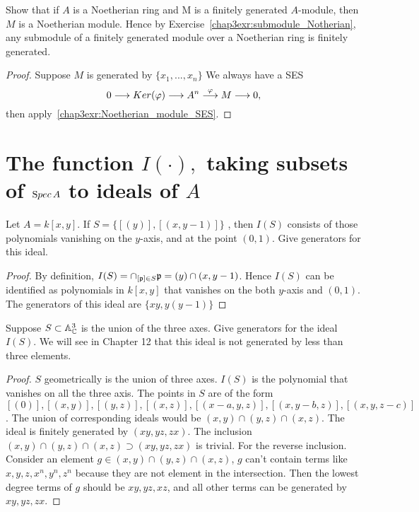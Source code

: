 \documentclass[11pt,fleqn]{book}
\begin{document}
\begin{exr}
Show that if $A$ is a Noetherian ring and M is a finitely generated $A$-module, then $M$ is a Noetherian module. Hence by Exercise~\ref{chap3exr:submodule_Notherian}, any submodule of a finitely generated module over a Noetherian ring is finitely generated.
\end{exr}
\begin{proof}
Suppose $M$ is generated by $\{x_1,...,x_n\}$
We always have a SES
$$
0\longrightarrow Ker(\varphi)\longrightarrow {A}^n\overset{\varphi}{\longrightarrow} M\longrightarrow 0,
$$
then apply~\ref{chap3exr:Noetherian_module_SES}.
\end{proof}
\section{The function $I(\cdot),$ taking subsets of ${\text Spec\,} A$ to ideals of $A$}

\begin{exr}
Let $A = k[x, y]$. If $S = \{[(y)], [(x, y - 1)]\} $ , then $I(S)$ consists of those polynomials vanishing on the $y$-axis, and at the point $(0, 1)$. Give generators for this ideal.
\end{exr}
\begin{proof}
By definition, $I(S)=\cap_{[{\mathfrak p}]\in S}{\mathfrak p}= (y)\cap (x,y-1)$. Hence $I(S)$ can be identified as polynomials in $k[x,y]$ that vanishes on the both $y$-axis and $(0,1)$. The generators of this ideal are $\{xy,y(y-1)\}$
\end{proof}

\begin{exr}
Suppose $S \subset \mathbb A^3_\mathbb C$ is the union of the three axes. Give generators for the ideal $I(S)$. We will see in Chapter 12 that this ideal is not generated by less than three elements.
\end{exr}
\begin{proof}
$S$ geometrically is the union of three axes. $I(S)$ is the polynomial that vanishes on all the three axis. The points in $S$ are of the form $[(0)],[(x,y)],[(y,z)], [(x,z)],[(x-a,y,z)],[(x,y-b,z)],[(x,y,z-c)]$. The union of corresponding ideals would be $(x,y)\cap (y,z)\cap (x,z)$. The ideal is finitely generated by $(xy,yz,zx)$.
The inclusion $(x,y)\cap (y,z)\cap (x,z)\supset (xy,yz,zx)$ is trivial. For the reverse inclusion. Consider an element $g\in (x,y)\cap (y,z)\cap (x,z)$, $g$ can't contain terms like $x,y,z,x^n,y^n,z^n$ because they are not element in the intersection. Then the  lowest degree terms of $g$ should be $xy,yz,xz$, and all other terms can be generated by $xy,yz,zx$.
\end{proof}
\end{document}
